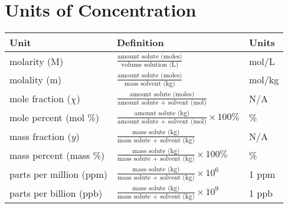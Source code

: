 \documentclass[10pt]{article}
\begin{document}
    \sectionspace
    \begin{minipage}[t]{0.5\textwidth}

    \end{minipage}%
    \sectionspace

    \begin{minipage}[t]{0.5\textwidth}
        \section*{Units of Concentration}
        \sectionspace
        \begin{tabular}{l l l}
            Unit        & Definition            & Units  \\
            \hline
            molarity (M)     & $\frac{\text{amount solute (moles)}}{\text{volume solution (L)}}$  & \si{mol/L} \\
            molality (m)      & $\frac{\text{amount solute (moles)}}{\text{mass solvent (kg)}}$   & \si{mol/kg} \\
            mole fraction ($\chi$) & $\frac{\text{amount solute (moles)}}{\text{amount solute + solvent (mol)}}$  & N/A \\
            mole percent (mol \%) & $\frac{\text{amount solute (kg)}}{\text{amount solute + solvent (mol)}} \times 100\%$ & \% \\
            mass fraction ($y$) & $\frac{\text{mass solute (kg)}}{\text{mass solute + solvent (kg)}}$  & N/A \\
            mass percent (mass \%) & $\frac{\text{mass solute (kg)}}{\text{mass solute + solvent (kg)}} \times 100\%$ & \% \\
            parts per million (ppm) & $\frac{\text{mass solute (kg)}}{\text{mass solute + solvent (kg)}} \times 10^6$ & 1 \si{ppm} \\
            parts per billion (ppb) & $\frac{\text{mass solute (kg)}}{\text{mass solute + solvent (kg)}} \times 10^9$ & 1 \si{ppb} \\
        \end{tabular}
    \end{minipage}%
\end{document}
